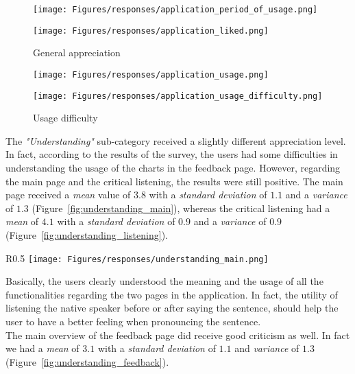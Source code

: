 \begin{figure}[!ht]
	\centering
	\begin{minipage}{.5\textwidth}
		\centering
		\texttt{[image: Figures/responses/application\_period\_of\_usage.png]}
		\caption{Moment of the day}
		\label{fig:application_period_of_usage}
	\end{minipage}%
	\begin{minipage}{.5\textwidth}
		\centering
		\texttt{[image: Figures/responses/application\_liked.png]}
		\caption{General appreciation}
		\label{fig:application_liked}
	\end{minipage}%
\end{figure}

\begin{figure}[!ht]
	\centering
	\begin{minipage}{.5\textwidth}
		\centering
		\texttt{[image: Figures/responses/application\_usage.png]}
		\caption{Interest in continuing using the application}
		\label{fig:application_usage}
	\end{minipage}%
	\begin{minipage}{.5\textwidth}
		\centering
		\texttt{[image: Figures/responses/application\_usage\_difficulty.png]}
		\caption{Usage difficulty}
		\label{fig:application_usage_difficulty}
	\end{minipage}
\end{figure}

\noindent The \textit{"Understanding"} sub-category received a slightly different appreciation level. In fact, according to the results of the survey, the users had some difficulties in understanding the usage of the charts in the feedback page. However, regarding the main page and the critical listening, the results were still positive. The main page received a \textit{mean} value of $3.8$ with a \textit{standard deviation} of $1.1$ and a \textit{variance} of $1.3$ (Figure~\ref{fig:understanding_main}), whereas the critical listening had a \textit{mean} of $4.1$ with a \textit{standard deviation} of $0.9$ and a \textit{variance} of $0.9$ (Figure~\ref{fig:understanding_listening}). 

\begin{wrapfigure}{R}{0.5\textwidth}
	\centering
	\texttt{[image: Figures/responses/understanding\_main.png]}
	\caption{Understanding the main page}
	\label{fig:understanding_main}
\end{wrapfigure}

Basically, the users clearly understood the meaning and the usage of all the functionalities regarding the two pages in the application. In fact, the utility of listening the native speaker before or after saying the sentence, should help the user to have a better feeling when pronouncing the sentence. \\
\noindent The main overview of the feedback page did receive good criticism as well. In fact we had a \textit{mean} of $3.1$ with a \textit{standard deviation} of $1.1$ and \textit{variance} of $1.3$ (Figure~\ref{fig:understanding_feedback}). \\ 

